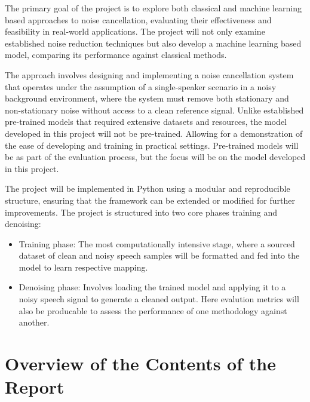 The primary goal of the project is to explore both classical and machine learning based approaches to noise cancellation, evaluating their effectiveness and feasibility in real-world applications. The project will not only examine established noise reduction techniques but also develop a machine learning based model, comparing its performance against classical methods.

The approach involves designing and implementing a noise cancellation system that operates under the assumption of a single-speaker scenario in a noisy background environment, where the system must remove both stationary and non-stationary noise without access to a clean reference signal. Unlike established pre-trained models that required extensive datasets and resources, the model developed in this project will not be pre-trained. Allowing for a demonstration of the ease of developing and training in practical settings. Pre-trained models will be as part of the evaluation process, but the focus will be on the model developed in this project.

The project will be implemented in Python using a modular and reproducible structure, ensuring that the framework can be extended or modified for further improvements. The project is structured into two core phases training and denoising:

\begin{itemize}
    \item Training phase: The most computationally intensive stage, where a sourced dataset of clean and noisy speech samples will be formatted and fed into the model to learn respective mapping.
    \item Denoising phase: Involves loading the trained model and applying it to a noisy speech signal to generate a cleaned output. Here evalution metrics will also be producable to assess the performance of one methodology against another.
\end{itemize}


\section{Overview of the Contents of the Report}